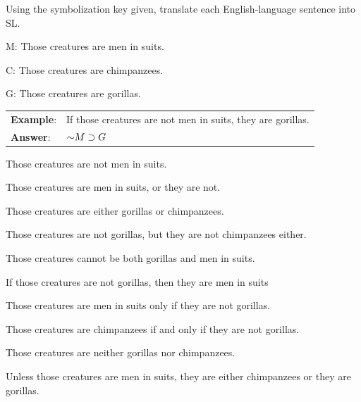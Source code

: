 \practiceproblems
\noindent\problempart Using the symbolization key given, translate each English-language sentence into SL.
\label{pr.monkeysuits}
\begin{ekey}
\item[M:] Those creatures are men in suits. 
\item[C:] Those creatures are chimpanzees. 
\item[G:] Those creatures are gorillas.
\end{ekey}

\begin{longtabu}{p{.1\linewidth}p{.9\linewidth}}
\textbf{Example}: & If those creatures are not men in suits, they are gorillas. \\
\textbf{Answer}: & $\mathord{\sim} M \supset G$ \\
\end{longtabu}


\begin{exercises}
\item Those creatures are not men in suits.  
\item Those creatures are men in suits, or they are not.  
\item Those creatures are either gorillas or chimpanzees.  
\item Those creatures are not gorillas, but they are not chimpanzees either.  
\item Those creatures cannot be both gorillas and men in suits.  
\item If those creatures are not gorillas, then they are men in suits  
\item Those creatures are men in suits only if they are not gorillas.  
\item Those creatures are chimpanzees if and only if they are not gorillas.  
\item Those creatures are neither gorillas nor chimpanzees.  %
\item Unless those creatures are men in suits, they are either chimpanzees or they are gorillas.  
\end{exercises}


